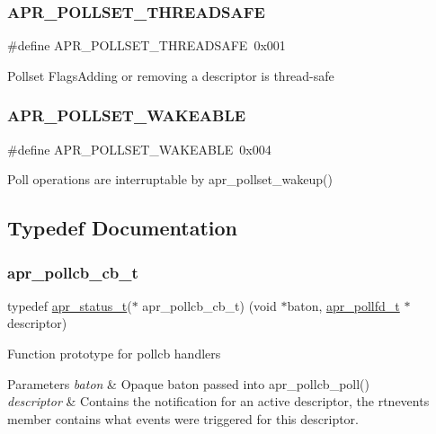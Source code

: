 \subsubsection{\texorpdfstring{A\+P\+R\+\_\+\+P\+O\+L\+L\+S\+E\+T\+\_\+\+T\+H\+R\+E\+A\+D\+S\+A\+FE}{APR\_POLLSET\_THREADSAFE}}
{\footnotesize\ttfamily \#define A\+P\+R\+\_\+\+P\+O\+L\+L\+S\+E\+T\+\_\+\+T\+H\+R\+E\+A\+D\+S\+A\+FE~0x001}

Pollset Flags\+Adding or removing a descriptor is thread-\/safe \mbox{\label{group__apr__poll_ga552d7f28d442602e6c9bb6931f183493}} 
\subsubsection{\texorpdfstring{A\+P\+R\+\_\+\+P\+O\+L\+L\+S\+E\+T\+\_\+\+W\+A\+K\+E\+A\+B\+LE}{APR\_POLLSET\_WAKEABLE}}
{\footnotesize\ttfamily \#define A\+P\+R\+\_\+\+P\+O\+L\+L\+S\+E\+T\+\_\+\+W\+A\+K\+E\+A\+B\+LE~0x004}

Poll operations are interruptable by apr\+\_\+pollset\+\_\+wakeup() 

\subsection{Typedef Documentation}
\mbox{\label{group__apr__poll_ga1dcd8c87e233dbf105e83d50ef601f55}} 
\subsubsection{\texorpdfstring{apr\+\_\+pollcb\+\_\+cb\+\_\+t}{apr\_pollcb\_cb\_t}}
{\footnotesize\ttfamily typedef \mbox{\hyperlink{group__apr__errno_gaf76ee4543247e9fb3f3546203e590a6c}{apr\+\_\+status\+\_\+t}}($\ast$ apr\+\_\+pollcb\+\_\+cb\+\_\+t) (void $\ast$baton, \mbox{\hyperlink{structapr__pollfd__t}{apr\+\_\+pollfd\+\_\+t}} $\ast$descriptor)}

Function prototype for pollcb handlers 
\begin{DoxyParams}{Parameters}
{\em baton} & Opaque baton passed into apr\+\_\+pollcb\+\_\+poll() \\
\hline
{\em descriptor} & Contains the notification for an active descriptor, the rtnevents member contains what events were triggered for this descriptor. \\
\hline
\end{DoxyParams}
\mbox{\label{group__apr__poll_gae382e39bdf0c5a02fca7da3944bece08}} 
